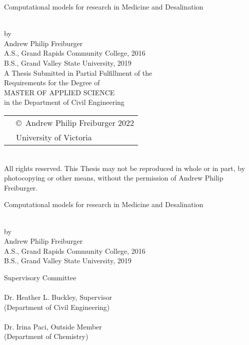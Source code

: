 \newcommand\thesistitle{
    Computational models for research in Medicine and Desalination 
}
\newcommand\nameanddegrees{
Andrew Philip Freiburger\\
A.S., Grand Rapids Community College, 2016\\
B.S., Grand Valley State University, 2019\\
}
\newcommand\panel{
    \HRule\\\panelist{Dr. Heather L. Buckley}{Supervisor}{Department of Civil Engineering}
    \HRule\\\panelist{Dr. Irina Paci}{Outside Member}{Department of Chemistry}
}

\newcommand\tpbreak{\\[\baselineskip]}
\newpage
\thispagestyle{empty}

\pagestyle{myheadings}

\pagebreak
{
    \centering
    \thesistitle
    \tpbreak
    
    by
    \tpbreak
    \nameanddegrees
    A Thesis Submitted in Partial Fulfillment of the \\
    Requirements for the Degree of
    \tpbreak
    MASTER OF APPLIED SCIENCE
    \tpbreak
    in the Department of Civil Engineering\\
    \vfill
    \begin{tabular}{cl}
        & \copyright\ Andrew Philip Freiburger 2022\\
        & \phantom{\copyright} University of Victoria
    \end{tabular}
    \tpbreak
    All rights reserved. This Thesis may not be reproduced in whole or in part, by \\
    \hfill photocopying or other means, without the permission of Andrew Philip Freiburger. 
    \hfill
}
\pagebreak

\newpage
{}
{
    \centering
    \thesistitle
    \tpbreak
    by
    \tpbreak
    \nameanddegrees
}
\newcommand\panelist[3]{\noindent #1, #2\\\noindent(#3)\tpbreak}
\vfill
\noindent Supervisory Committee
\tpbreak
\panel
\vfill
\pagebreak

